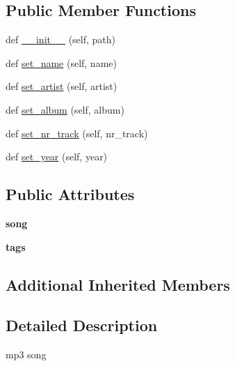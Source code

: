 \subsection*{Public Member Functions}
\begin{DoxyCompactItemize}
\item 
def \hyperlink{classhal_1_1files_1_1models_1_1_m_p3_song_a4f37efc2f666bf142bb1ed2370244fef}{\+\_\+\+\_\+init\+\_\+\+\_\+} (self, path)
\item 
def \hyperlink{classhal_1_1files_1_1models_1_1_m_p3_song_ae4f958b7afa7212cff8470163854a0ed}{set\+\_\+name} (self, name)
\item 
def \hyperlink{classhal_1_1files_1_1models_1_1_m_p3_song_abecb2c34045dbd2133e898114198d518}{set\+\_\+artist} (self, artist)
\item 
def \hyperlink{classhal_1_1files_1_1models_1_1_m_p3_song_afda62b2b1519b7bc65e8cd98d8f2e2bf}{set\+\_\+album} (self, album)
\item 
def \hyperlink{classhal_1_1files_1_1models_1_1_m_p3_song_a6b456dde38763b13fb10266b7910b63f}{set\+\_\+nr\+\_\+track} (self, nr\+\_\+track)
\item 
def \hyperlink{classhal_1_1files_1_1models_1_1_m_p3_song_ac14c40460b53a47979a58864409a366c}{set\+\_\+year} (self, year)
\end{DoxyCompactItemize}
\subsection*{Public Attributes}
\begin{DoxyCompactItemize}
\item 
{\bfseries song}\hypertarget{classhal_1_1files_1_1models_1_1_m_p3_song_a767b9af9e2e01ce942a44cfa7cda2653}{}\label{classhal_1_1files_1_1models_1_1_m_p3_song_a767b9af9e2e01ce942a44cfa7cda2653}

\item 
{\bfseries tags}\hypertarget{classhal_1_1files_1_1models_1_1_m_p3_song_a57a2d42a3326e55f553c1a79678dd6b5}{}\label{classhal_1_1files_1_1models_1_1_m_p3_song_a57a2d42a3326e55f553c1a79678dd6b5}

\end{DoxyCompactItemize}
\subsection*{Additional Inherited Members}


\subsection{Detailed Description}
\begin{DoxyVerb}mp3 song \end{DoxyVerb}
 

